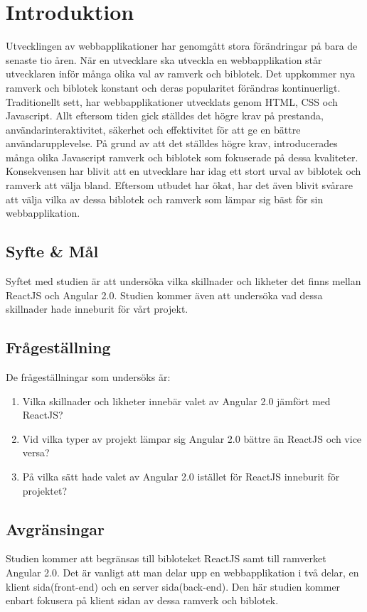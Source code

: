 \section{Introduktion}
\label{sec:axel-introduction}
Utvecklingen av webbapplikationer har genomgått stora förändringar på bara de senaste tio åren. När en utvecklare ska utveckla en webbapplikation står utvecklaren inför många olika val av ramverk och biblotek. Det uppkommer nya ramverk och biblotek konstant och deras popularitet förändras kontinuerligt. Traditionellt sett, har webbapplikationer utvecklats genom HTML, CSS och Javascript. Allt eftersom tiden gick ställdes det högre krav på prestanda, användarinteraktivitet, säkerhet och effektivitet för att ge en bättre användarupplevelse. På grund av att det ställdes högre krav, introducerades många olika Javascript ramverk och biblotek som fokuserade på dessa kvaliteter. Konsekvensen har blivit att en utvecklare har idag ett stort urval av biblotek och ramverk att välja bland. Eftersom utbudet har ökat, har det även blivit svårare att välja vilka av dessa biblotek och ramverk som lämpar sig bäst för sin webbapplikation.

\subsection{Syfte \& Mål}
\label{subsec:motivation}

Syftet med studien är att undersöka vilka skillnader och likheter det finns mellan ReactJS och Angular 2.0. Studien kommer även att undersöka vad dessa skillnader hade inneburit för vårt projekt. 

\subsection{Frågeställning}
\label{subsec:research-questions}

De frågeställningar som undersöks är:

\begin{enumerate}
\item Vilka skillnader och likheter innebär valet av Angular 2.0 jämfört med ReactJS?

\item Vid vilka typer av projekt lämpar sig Angular 2.0 bättre än ReactJS och vice versa?

\item På vilka sätt hade valet av Angular 2.0 istället för ReactJS inneburit för projektet?


\end{enumerate}


\subsection{Avgränsingar}
\label{subsec:delimitations}
Studien kommer att begränsas till bibloteket ReactJS samt till ramverket Angular 2.0. Det är vanligt att man delar upp en webbapplikation i två delar, en klient sida(front-end) och en server sida(back-end). Den här studien kommer enbart fokusera på klient sidan av dessa ramverk och biblotek. 

